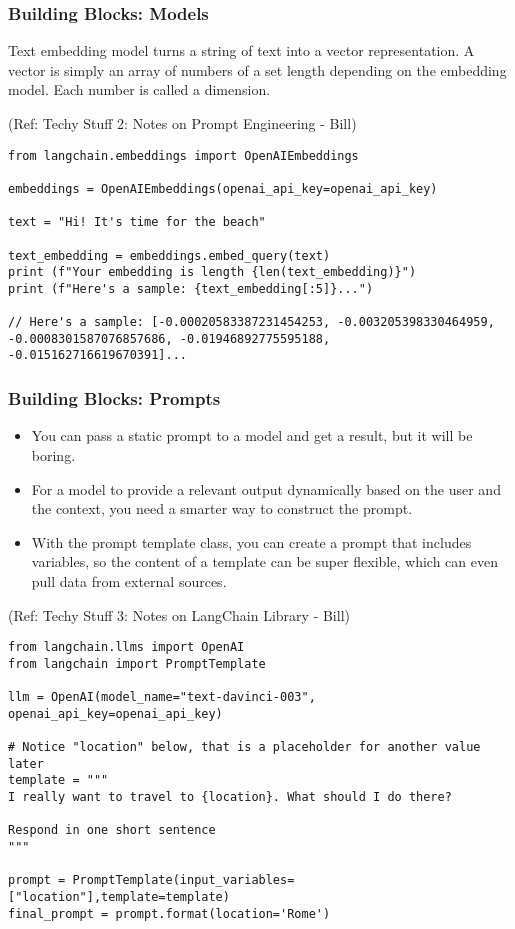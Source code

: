 \begin{frame}[fragile]\frametitle{Building Blocks: Models}

Text embedding model turns a string of text into a vector representation. A vector is simply an array of numbers of a set length depending on the embedding model. Each number is called a dimension.

{\tiny (Ref: Techy Stuff 2: Notes on Prompt Engineering - Bill)}

\begin{lstlisting}
from langchain.embeddings import OpenAIEmbeddings

embeddings = OpenAIEmbeddings(openai_api_key=openai_api_key)

text = "Hi! It's time for the beach"

text_embedding = embeddings.embed_query(text)
print (f"Your embedding is length {len(text_embedding)}")
print (f"Here's a sample: {text_embedding[:5]}...")

// Here's a sample: [-0.00020583387231454253, -0.003205398330464959, -0.0008301587076857686, -0.01946892775595188, -0.015162716619670391]...
\end{lstlisting}	  
\end{frame}


\begin{frame}[fragile]\frametitle{Building Blocks: Prompts}

\begin{itemize}
\item You can pass a static prompt to a model and get a result, but it will be boring. 
\item For a model to provide a relevant output dynamically based on the user and the context, you need a smarter way to construct the prompt.
\item With the prompt template class, you can create a prompt that includes variables, so the content of a template can be super flexible, which can even pull data from external sources.
\end{itemize}

{\tiny (Ref: Techy Stuff 3: Notes on LangChain Library - Bill)}

\begin{lstlisting}
from langchain.llms import OpenAI
from langchain import PromptTemplate

llm = OpenAI(model_name="text-davinci-003", openai_api_key=openai_api_key)

# Notice "location" below, that is a placeholder for another value later
template = """
I really want to travel to {location}. What should I do there?

Respond in one short sentence
"""

prompt = PromptTemplate(input_variables=["location"],template=template)
final_prompt = prompt.format(location='Rome')
\end{lstlisting}	  
\end{frame}

